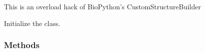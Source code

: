 \documentclass[a4paper,10pt,english,openany,oneside]{sphinxmanual}
\begin{document}
\begin{fulllineitems}
\label{\detokenize{reference/generated/paramagpy.protein.CustomStructureBuilder:paramagpy.protein.CustomStructureBuilder}}
This is an overload hack of BioPython’s CustomStructureBuilder

\begin{fulllineitems}
\label{\detokenize{reference/generated/paramagpy.protein.CustomStructureBuilder:paramagpy.protein.CustomStructureBuilder.__init__}}
Initialize the class.
\subsubsection*{Methods}


\begin{savenotes}\sphinxatlongtablestart\begin{longtable}{}
\hline

\endfirsthead

%
{}\\
\hline

\endhead

\hline
{}\\
\endfoot

\endlastfoot


\end{longtable}
\end{savenotes}
\end{fulllineitems}
\end{fulllineitems}
\end{document}
